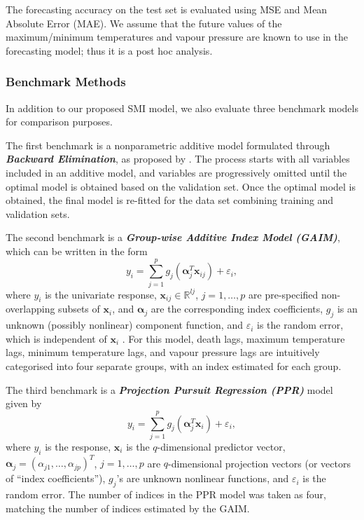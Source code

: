 \documentclass[
  11pt,
  a4paper,
]{article}
\begin{document}
The forecasting accuracy on the test set is evaluated using MSE and Mean
Absolute Error (MAE). We assume that the future values of the
maximum/minimum temperatures and vapour pressure are known to use in the
forecasting model; thus it is a post hoc analysis.

\subsubsection{Benchmark Methods}\label{sec-benchmark}

In addition to our proposed SMI model, we also evaluate three benchmark
models for comparison purposes.

The first benchmark is a nonparametric additive model formulated through
\textbf{\emph{Backward Elimination}}, as proposed by \textcite{FH2012}.
The process starts with all variables included in an additive model, and
variables are progressively omitted until the optimal model is obtained
based on the validation set. Once the optimal model is obtained, the
final model is re-fitted for the data set combining training and
validation sets.

The second benchmark is a \textbf{\emph{Group-wise Additive Index Model
(GAIM)}}, which can be written in the form \[
  y_{i} = \sum_{j = 1}^{p} g_{j}(\bm{\alpha}_{j}^{T}\bm{x}_{ij}) + \varepsilon_{i},
\] where \(y_{i}\) is the univariate response,
\(\bm{x}_{ij} \in \mathbb{R}^{l{j}}\), \(j = 1, \dots, p\) are
pre-specified non-overlapping subsets of \(\bm{x}_{i}\), and
\(\bm{\alpha}_j\) are the corresponding index coefficients, \(g_{j}\) is
an unknown (possibly nonlinear) component function, and
\(\varepsilon_{i}\) is the random error, which is independent of
\(\bm{x}_{i}\) \autocite{Wang2015,Masselot2022}. For this model, death
lags, maximum temperature lags, minimum temperature lags, and vapour
pressure lags are intuitively categorised into four separate groups,
with an index estimated for each group.

The third benchmark is a \textbf{\emph{Projection Pursuit Regression
(PPR)}} model \autocite{Friedman1981} given by \[
  y_{i} = \sum_{j=1}^{p} {g_{j}(\bm{\alpha}_{j}^{T}\bm{x}_{i})} + \varepsilon_{i},
\] where \(y_{i}\) is the response, \(\bm{x}_{i}\) is the
\(q\)-dimensional predictor vector,
\(\bm{\alpha}_{j} = ( \alpha_{j1}, \dots, \alpha_{jp} )^{T}\),
\(j = 1, \dots, p\) are \(q\)-dimensional projection vectors (or vectors
of ``index coefficients''), \(g_{j}\)'s are unknown nonlinear functions,
and \(\varepsilon_{i}\) is the random error. The number of indices in
the PPR model was taken as four, matching the number of indices
estimated by the GAIM.
\end{document}
